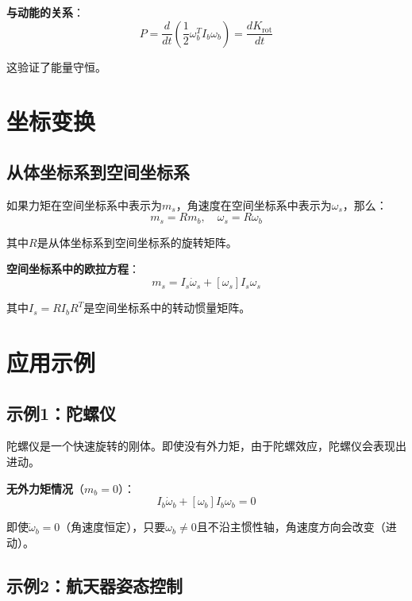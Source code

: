 \documentclass[12pt,a4paper]{article}
\begin{document}
\textbf{与动能的关系}：
\begin{equation}
P = \frac{d}{dt}\left(\frac{1}{2} \omega_b^T I_b \omega_b\right) = \frac{dK_{\text{rot}}}{dt}
\end{equation}

这验证了能量守恒。

\section{坐标变换}

\subsection{从体坐标系到空间坐标系}

如果力矩在空间坐标系中表示为$m_s$，角速度在空间坐标系中表示为$\omega_s$，那么：
\begin{equation}
m_s = R m_b, \quad \omega_s = R \omega_b
\end{equation}

其中$R$是从体坐标系到空间坐标系的旋转矩阵。

\textbf{空间坐标系中的欧拉方程}：
\begin{equation}
m_s = I_s \dot{\omega}_s + [\omega_s] I_s \omega_s
\end{equation}

其中$I_s = R I_b R^T$是空间坐标系中的转动惯量矩阵。

\section{应用示例}

\subsection{示例1：陀螺仪}

陀螺仪是一个快速旋转的刚体。即使没有外力矩，由于陀螺效应，陀螺仪会表现出进动。

\textbf{无外力矩情况}（$m_b = 0$）：
\begin{equation}
I_b \dot{\omega}_b + [\omega_b] I_b \omega_b = 0
\end{equation}

即使$\dot{\omega}_b = 0$（角速度恒定），只要$\omega_b \neq 0$且不沿主惯性轴，角速度方向会改变（进动）。

\subsection{示例2：航天器姿态控制}
\end{document}
